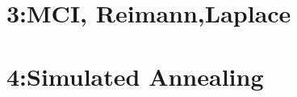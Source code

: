 \documentclass{article}
\begin{document}
\section*{3:MCI, Reimann,Laplace}


\begin{description}
	\item[]
	
\end{description}


\section*{4:Simulated Annealing}
\end{document}
